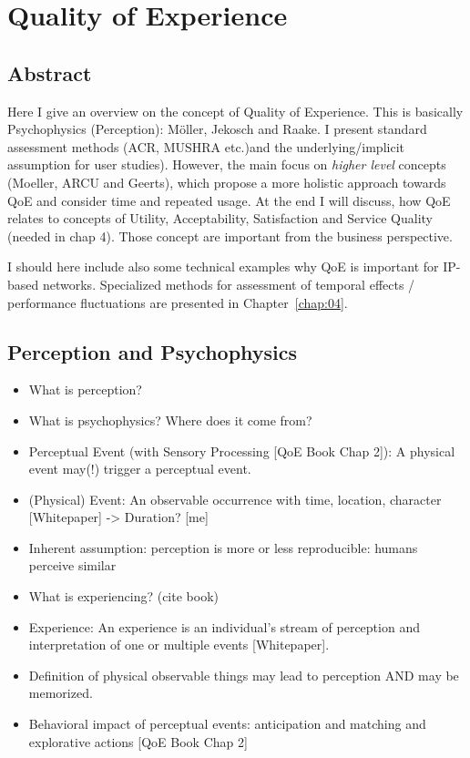 \chapter{Quality of Experience}
\section*{Abstract}
Here I give an overview on the concept of Quality of Experience.
This is basically Psychophysics (Perception): Möller, Jekosch and Raake.
I present standard assessment methods (ACR, MUSHRA etc.)and the underlying/implicit assumption for user studies).
However, the main focus on \textit{higher level} concepts (Moeller, ARCU and Geerts), which propose a more holistic approach towards QoE and consider time and repeated usage.
At the end I will discuss, how QoE relates to concepts of Utility, Acceptability, Satisfaction and Service Quality (needed in chap 4).
Those concept are important from the business perspective.

I should here include also some technical examples why QoE is important for IP-based networks.
Specialized methods for assessment of temporal effects / performance fluctuations are presented in Chapter~\ref{chap:04}.

\section{Perception and Psychophysics}
\begin{itemize}
\item What is perception?
\item What is psychophysics? Where does it come from?
\item Perceptual Event (with Sensory Processing [QoE Book Chap 2]): A physical event may(!) trigger a perceptual event.
\item (Physical) Event: An observable occurrence with time, location, character [Whitepaper] -> Duration? [me]
\item Inherent assumption: perception is more or less reproducible: humans perceive similar

\item What is experiencing? (cite book)
\item Experience: An experience is an individual's stream of perception and interpretation of one or multiple events [Whitepaper].
\item Definition of physical observable things may lead to perception AND may be memorized.
\item Behavioral impact of perceptual events: anticipation and matching and explorative actions [QoE Book Chap 2]
\end{itemize}

